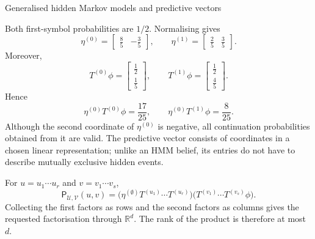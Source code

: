 \begin{exercise}[Extension]{Generalised hidden Markov models and predictive vectors}
\begin{solution}
\begin{parts}
\begin{subparts}
          \item Both first-symbol probabilities are $1/2$. Normalising gives
            \[
              \eta^{(0)}
                =\begin{bmatrix}\tfrac85&-\tfrac35\end{bmatrix},
              \qquad
              \eta^{(1)}
                =\begin{bmatrix}\tfrac25&\tfrac35\end{bmatrix}.
            \]
            Moreover,
            \[
              T^{(0)}\phi
                =\begin{bmatrix}\tfrac12\\[1mm]\tfrac15\end{bmatrix},
              \qquad
              T^{(1)}\phi
                =\begin{bmatrix}\tfrac12\\[1mm]\tfrac45\end{bmatrix}.
            \]
            Hence
            \[
              \eta^{(0)}T^{(0)}\phi=\frac{17}{25},
              \qquad
              \eta^{(0)}T^{(1)}\phi=\frac8{25}.
            \]
            Although the second coordinate of $\eta^{(0)}$ is negative, all
            continuation probabilities obtained from it are valid. The
            predictive vector consists of coordinates in a chosen linear
            representation; unlike an HMM belief, its entries do not have to
            describe mutually exclusive hidden events.
        \end{subparts}

      \item
        \begin{subparts}
          \item For $u=u_1\cdots u_r$ and $v=v_1\cdots v_s$,
            \[
              \mathsf P_{\mathcal U,\mathcal V}(u,v)
                =
                \bigl(\eta^{(\emptyset)}
                  T^{(u_1)}\cdots T^{(u_r)}\bigr)
                \bigl(T^{(v_1)}\cdots T^{(v_s)}\phi\bigr).
            \]
            Collecting the first factors as rows and the second factors as
            columns gives the requested factorisation through
            $\mathbb R^d$. The rank of the product is therefore at most $d$.


\end{subparts}
\end{parts}
\end{solution}
\end{exercise}
